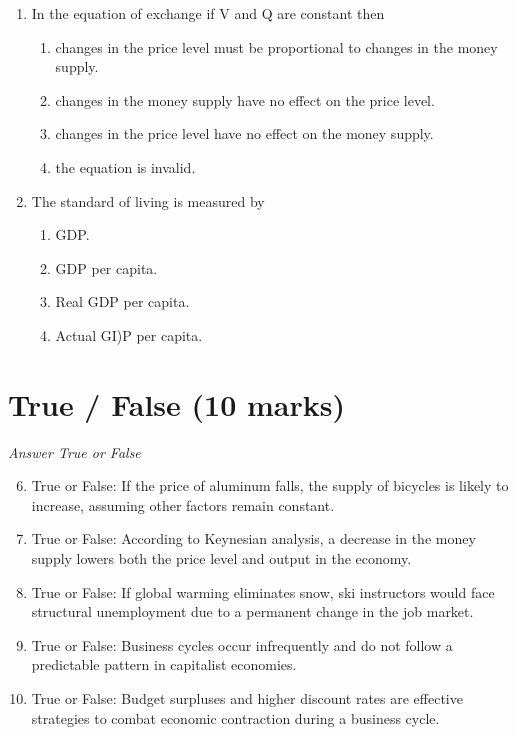 \documentclass[12pt]{article}
\begin{document}
\begin{enumerate}[label=\arabic*.]
\begin{enumerate}[label=(\alph*)]
    \item GDP increases and the price level increases.
\end{enumerate}
\item In the equation of exchange if V and Q are constant then
\begin{enumerate}[label=(\alph*)]
    \item changes in the price level must be proportional to changes in the money supply.
    \item changes in the money supply have no effect on the price level.
    \item changes in the price level have no effect on the money supply.
    \item the equation is invalid.
\end{enumerate}
\item The standard of living is measured by
\begin{enumerate}[label=(\alph*)]
    \item GDP.
    \item GDP per capita.
    \item Real GDP per capita.
    \item Actual GI)P per capita.
\end{enumerate}
\end{enumerate}

\section*{True / False (10 marks)}
\textit{Answer True or False}
\begin{enumerate}[label=\arabic*.]
\setcounter{enumi}{5}
\item True or False: If the price of aluminum falls, the supply of bicycles is likely to increase, assuming other factors remain constant.
\item True or False: According to Keynesian analysis, a decrease in the money supply lowers both the price level and output in the economy.
\item True or False: If global warming eliminates snow, ski instructors would face structural unemployment due to a permanent change in the job market.
\item True or False: Business cycles occur infrequently and do not follow a predictable pattern in capitalist economies.
\item True or False: Budget surpluses and higher discount rates are effective strategies to combat economic contraction during a business cycle.
\end{enumerate}
\end{document}
